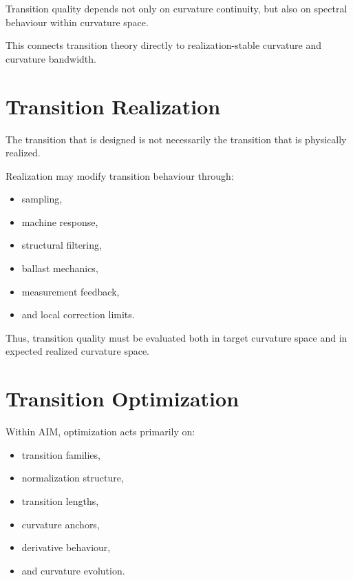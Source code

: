 \begin{proposition}
\label{prop:spectral-transition-principle}
Transition quality depends not only on curvature continuity, but also on
spectral behaviour within curvature space.
\end{proposition}

This connects transition theory directly to realization-stable curvature
and curvature bandwidth.

\section{Transition Realization}

The transition that is designed is not necessarily the transition that
is physically realized.

Realization may modify transition behaviour through:
\begin{itemize}
\item sampling,
\item machine response,
\item structural filtering,
\item ballast mechanics,
\item measurement feedback,
\item and local correction limits.
\end{itemize}

Thus, transition quality must be evaluated both in target curvature space
and in expected realized curvature space.

\section{Transition Optimization}

Within AIM, optimization acts primarily on:
\begin{itemize}
\item transition families,
\item normalization structure,
\item transition lengths,
\item curvature anchors,
\item derivative behaviour,
\item and curvature evolution.
\end{itemize}

